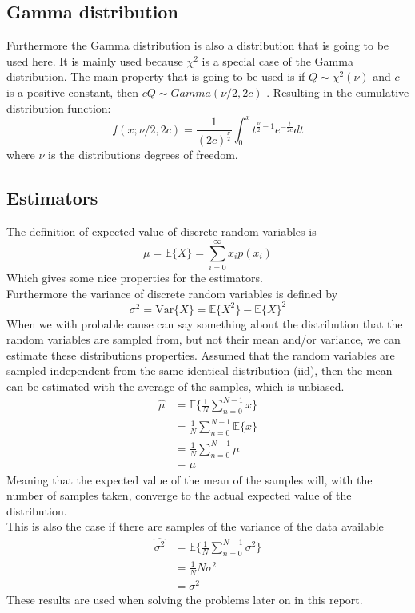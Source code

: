 \subsection{Gamma distribution}
Furthermore the Gamma distribution is also a distribution that is going to be used here. It is mainly used because $\chi^2$ is a special case of the Gamma distribution. The main property that is going to be used is if $Q\sim\chi^2(\nu)$ and $c$ is a positive constant, then $cQ\sim Gamma(\nu/2, 2c)$ \cite{WikipediaGamma}. Resulting in the cumulative distribution function:
\begin{equation}
    f(x; \nu/2, 2c) = \frac{1}{(2c)^{\frac{\nu}{2}}}\int_{0}^{x}t^{\frac{\nu}{2}-1}e^{-\frac{t}{2c}}dt
\end{equation}
where $\nu$ is the distributions degrees of freedom.

\subsection{Estimators}
The definition of expected value of discrete random variables is
\begin{equation}
    \mu = \mathbb{E}\{X\} = \sum_{i=0}^{\infty}x_ip(x_i)
\end{equation}\label{eq:expecteddef}
Which gives some nice properties for the estimators.\\
Furthermore the variance of discrete random variables is defined by
\begin{equation}
    \sigma^2 = \text{Var}\{X\} = \mathbb{E}\{X^2\}-\mathbb{E}\{X\}^2
\end{equation}\label{eq:variancedef}
When we with probable cause can say something about the distribution that the random variables are sampled from, but not their mean and/or variance, we can estimate these distributions properties. Assumed that the random variables are sampled independent from the same identical distribution (iid), then the mean can be estimated with the average of the samples, which is unbiased.
\begin{align}
	\hat{\mu} & = \mathbb{E}\{\frac{1}{N}\sum_{n=0}^{N-1}x\}\nonumber\\
	& = \frac{1}{N}\sum_{n=0}^{N-1}\mathbb{E}\{x\}\nonumber\\
	& = \frac{1}{N}\sum_{n=0}^{N-1}\mu\nonumber\\
	& = \mu\label{eq:mu_est}
\end{align}
Meaning that the expected value of the mean of the samples will, with the number of samples taken, converge to the actual expected value of the distribution.\\
This is also the case if there are samples of the variance of the data available
\begin{align}
	\hat{\sigma^2} & = \mathbb{E}\{\frac{1}{N}\sum_{n=0}^{N-1}\sigma^2\}\nonumber\\
	& = \frac{1}{N}N\sigma^2\nonumber\\
	& = \sigma^2\label{eq:sigma_est}
\end{align}
These results are used when solving the problems later on in this report.


